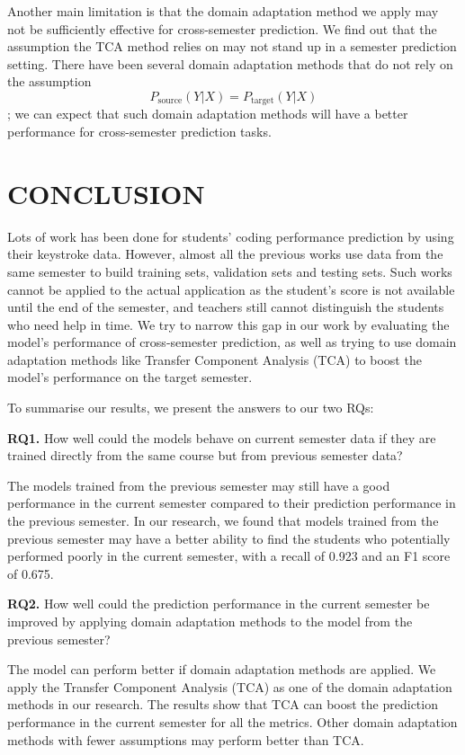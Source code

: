 \documentclass[sigconf,final]{acmart}
\begin{document}
Another main limitation is that the domain adaptation method we apply may not be sufficiently effective for cross-semester prediction. We find out that the assumption the TCA method relies on may not stand up in a semester prediction setting. There have been several domain adaptation methods that do not rely on the assumption $$P_{\text{source}}(Y|X) = P_{\text{target}}(Y|X)$$; we can expect that such domain adaptation methods will have a better performance for cross-semester prediction tasks.

\section{CONCLUSION}

Lots of work has been done for students’ coding performance prediction by using their keystroke data. However, almost all the previous works use data from the same semester to build training sets, validation sets and testing sets. Such works cannot be applied to the actual application as the student’s score is not available until the end of the semester, and teachers still cannot distinguish the students who need help in time. We try to narrow this gap in our work by evaluating the model’s performance of cross-semester prediction, as well as trying to use domain adaptation methods like Transfer Component Analysis (TCA) to boost the model’s performance on the target semester.

To summarise our results, we present the answers to our two RQs:


\textbf{RQ1.} How well could the models behave on current semester data if they are trained directly from the same course but from previous semester data?


The models trained from the previous semester may still have a good performance in the current semester compared to their prediction performance in the previous semester. In our research, we found that models trained from the previous semester may have a better ability to find the students who potentially performed poorly in the current semester, with a recall of 0.923 and an F1 score of 0.675. 


\textbf{RQ2.} How well could the prediction performance in the current semester be improved by applying domain adaptation methods to the model from the previous semester?


The model can perform better if domain adaptation methods are applied. We apply the Transfer Component Analysis (TCA) as one of the domain adaptation methods in our research. The results show that TCA can boost the prediction performance in the current semester for all the metrics. Other domain adaptation methods with fewer assumptions may perform better than TCA.
\end{document}
